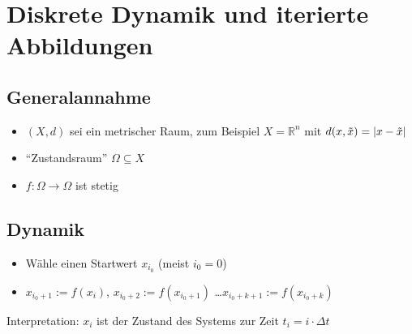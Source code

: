 \section{Diskrete Dynamik und iterierte Abbildungen} %
\label{sec:1}

\subsection*{Generalannahme} %
\label{sub:Generalannahme}
\begin{itemize}
	\item $(X,d)$ sei ein metrischer Raum, zum Beispiel $X=\mathds{R}^n$ mit $d(x,\tilde{x})= \abs*{x - \tilde{x}}$
	\item \enquote{Zustandsraum} $\Omega \subseteq X$
	\item $f \colon \Omega \to \Omega$ ist stetig
\end{itemize}

\subsection*{Dynamik} %
\label{sub:dynamik}
\begin{itemize}
	\item Wähle einen Startwert $x_{i_0}$ (meist $i_0 =0$)
	\item $x_{i_0+1} := f(x_i)$, $x_{i_0+2} := f(x_{i_0+1})$ \ldots $x_{i_0+k+1} := f(x_{i_0+k})$
\end{itemize}
Interpretation: $x_i$ ist der Zustand des Systems zur Zeit $t_i= i \cdot \Delta t$

